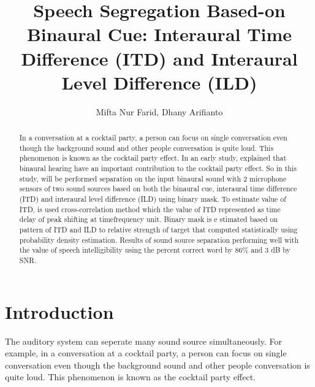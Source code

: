 \documentclass[a4paper]{jpconf}
\begin{document}
\title{Speech Segregation Based-on Binaural Cue: Interaural Time Difference (ITD) and Interaural Level Difference (ILD)}

\author{Mifta Nur Farid, Dhany Arifianto}

\address{Dept. of Engineering Physics, Faculty of Industrial Technology, Institut Teknologi Sepuluh Nopember, Kampus ITS Sukolilo, Surabaya 60111, Indonesia}


\begin{abstract}
In a conversation at a cocktail party, a person can focus on single conversation even though the background sound and other people conversation is quite loud. This phenomenon is known as the cocktail party effect. In an early study, explained that binaural hearing have an important contribution to the cocktail party effect. So in this study, will be performed separation on the input binaural sound with 2 microphone sensors of two sound sources based on both the binaural cue, interaural time difference (ITD) and interaural level difference (ILD) using binary mask. To estimate value of ITD, is used cross-correlation method which the value of ITD represented as time delay of peak shifting at timefrequency unit. Binary mask is e stimated based on pattern of ITD and ILD to relative strength of target that computed statistically using probability density estimation. Results of sound source separation performing well with the value of speech intelligibility using the percent correct word by 86\% and 3 dB by SNR.
\end{abstract}


\section{Introduction}
The auditory system can seperate many sound source simultaneously. For example, in a conversation at a cocktail party, a person can focus on single conversation even though the background sound and other people conversation is quite loud. This phenomenon is known as the cocktail party effect.





 

\end{document}
